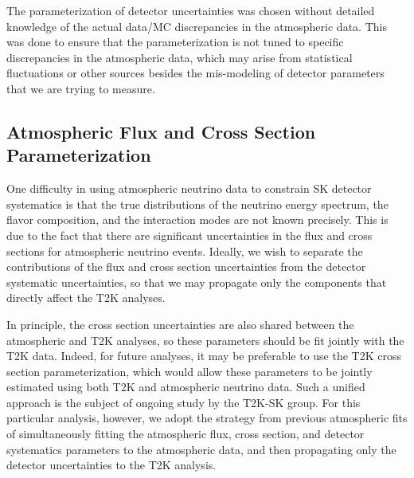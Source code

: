 
The parameterization of detector uncertainties was chosen without detailed
knowledge of the actual data/MC discrepancies in the atmospheric data.  This
was done to ensure that the parameterization is not tuned to specific
discrepancies in the atmospheric data, which may arise from statistical
fluctuations or other sources besides the mis-modeling of detector parameters
that we are trying to measure.  



\subsection{Atmospheric Flux and Cross Section Parameterization}
\label{subsec:alphapar}

One difficulty in using atmospheric neutrino data to constrain SK detector
systematics is that the true distributions of the neutrino energy spectrum, the
flavor composition, and the interaction modes are not known precisely.  This is
due to the fact that there are significant uncertainties in the flux and cross
sections for atmospheric neutrino events.  Ideally, we wish to separate the
contributions of the flux and cross section uncertainties from the detector
systematic uncertainties, so that we may propagate only the components that
directly affect the T2K analyses. 

In principle, the cross section uncertainties are also shared between the
atmospheric and T2K analyses, so these parameters should be fit jointly with
the T2K data. Indeed, for future analyses, it may be preferable to use the T2K
cross section parameterization, which would allow these parameters to be
jointly estimated using both T2K and atmospheric neutrino data. Such a unified
approach is the subject of ongoing study by the T2K-SK group. For this
particular analysis, however, we adopt the strategy from previous atmospheric fits of
simultaneously fitting the atmospheric flux, cross section, and detector
systematics parameters to the atmospheric data, and then propagating only the
detector uncertainties to the T2K analysis. 


